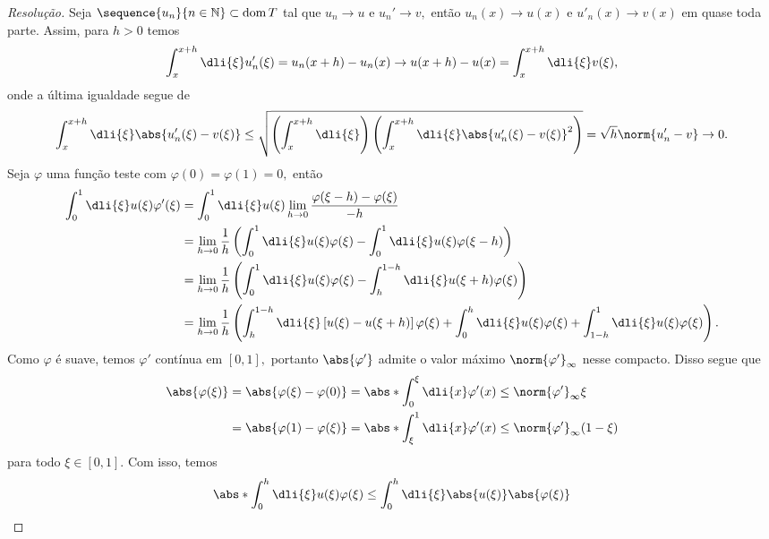\begin{proof}[Resolução]
  Seja \(\sequence{u_n}{n\in\mathbb{N}} \subset \dom{T}\) tal que \(u_n \to u\) e \(u_n' \to v,\) então \(u_n(x) \to u(x)\) e \(u'_n(x) \to v(x)\) em quase toda parte. Assim, para \(h > 0\) temos
  \begin{equation*}
    \int_x^{x+h} \dli{\xi} u_n'(\xi) = u_n(x + h)  - u_n(x) \to u(x+h) - u(x) = \int_x^{x+h}\dli{\xi} v(\xi),
  \end{equation*}
  onde a última igualdade segue de
  \begin{equation*}
    \int_x^{x + h} \dli{\xi} \abs{u_n'(\xi) - v(\xi)} \leq \sqrt{\left(\int_x^{x+h} \dli{\xi}\right)\left(\int_x^{x+h} \dli{\xi} \abs{u_n'(\xi) - v(\xi)}^2\right)} = \sqrt{h} \norm{u_n' - v} \to 0.
  \end{equation*}
  Seja \(\varphi\) uma função teste com \(\varphi(0) = \varphi(1) = 0,\) então
  \begin{align*}
    \int_0^1 \dli{\xi} u(\xi) \varphi'(\xi) &= \int_0^1 \dli{\xi} u(\xi) \lim_{h \to 0} \frac{\varphi(\xi - h) - \varphi(\xi)}{-h}\\
                                            &= \lim_{h\to 0}\frac{1}{h}\left(\int_0^1 \dli{\xi} u(\xi) \varphi(\xi) - \int_0^1 \dli{\xi} u(\xi) \varphi(\xi - h)\right)\\
                                            &= \lim_{h\to0}\frac1h \left(\int_0^1\dli{\xi} u(\xi)\varphi(\xi) - \int_h^{1-h}\dli{\xi}u(\xi + h)\varphi(\xi)\right)\\
                                            &= \lim_{h\to0} \frac{1}{h} \left(\int_h^{1-h} \dli{\xi} \left[u(\xi) - u(\xi + h)\right]\varphi(\xi) + \int_0^h \dli{\xi} u(\xi) \varphi(\xi) + \int_{1-h}^1\dli{\xi} u(\xi)\varphi(\xi)\right).
  \end{align*}
  Como \(\varphi\) é suave, temos \(\varphi'\) contínua em \([0,1],\) portanto \(\abs{\varphi'}\) admite o valor máximo \(\norm{\varphi'}_\infty\) nesse compacto. Disso segue que
  \begin{align*}
    \abs{\varphi(\xi)} &= \abs{\varphi(\xi) - \varphi(0)} = \abs*{\int_0^\xi\dli{x}\varphi'(x)} \leq \norm{\varphi'}_{\infty}\xi\\
                       &= \abs{\varphi(1) - \varphi(\xi)} = \abs*{\int_\xi^1\dli{x} \varphi'(x)} \leq \norm{\varphi'}_\infty(1 - \xi)
  \end{align*}
  para todo \(\xi \in [0,1].\) Com isso, temos
  \begin{align*}
    \abs*{\int_0^h\dli{\xi} u(\xi) \varphi(\xi)} &\leq \int_0^h \dli{\xi}\abs{u(\xi)} \abs{\varphi(\xi)}\\

\end{align*}
\end{proof}
